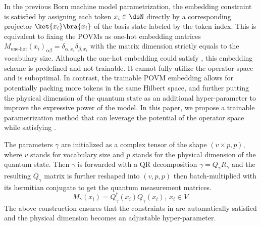 In the previous Born machine model parametrization, the embedding constraint is satisfied by assigning each token $x_i\in\dsN$ directly by a corresponding projector $\ket{x_i}\bra{x_i}$ of the basis state\cite{PhysRevX.8.031012} labeled by the token index. This is equivalent to fixing the POVMs as one-hot embedding matrices $M_\text{one-hot}(x_i)_{\alpha\beta}=\delta_{\alpha,x_i}\delta_{\beta,x_i}$ with the matrix dimension strictly equals to the vocabulary size. Although the one-hot embedding could satisfy , this embedding scheme is predefined and not trainable. It cannot fully utilize the operator space and is suboptimal. In contrast, the trainable POVM embedding allows for potentially packing more tokens in the same Hilbert space, and further putting the physical dimension of the quantum state as an additional hyper-parameter to improve the expressive power of the model. In this paper, we propose a trainable parametrization method that can leverage the potential of the operator space while satisfying .

The parameters $\gamma$ are initialized as a complex tensor of the shape $(v \times p, p)$, where $v$ stands for vocabulary size and $p$ stands for the physical dimension of the quantum state. Then $\gamma$ is forwarded with a QR decomposition $\gamma=Q_\gamma R_\gamma$ and the resulting $Q_{\gamma}$ matrix is further reshaped into $(v, p, p)$ then batch-multiplied with its hermitian conjugate to get the quantum measurement matrices. 
\begin{equation}\label{eq: parametrization}
    M_{\gamma}(x_{i})=Q^{\dagger}_{\gamma}(x_i)Q_{\gamma}(x_i), \ x_i\in V.
\end{equation}
The above construction ensures that the constraints in  are automatically satisfied and the physical dimension becomes an adjustable hyper-parameter.

